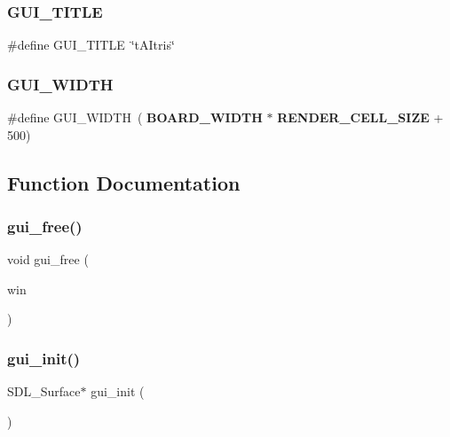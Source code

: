 \mbox{\label{gui_8h_a88560096823bda7d0ff9165dec4c412a}} 
\subsubsection{G\+U\+I\+\_\+\+T\+I\+T\+LE}
{\footnotesize\ttfamily \#define G\+U\+I\+\_\+\+T\+I\+T\+LE~\char`\"{}t\+A\+Itris\char`\"{}}

\mbox{\label{gui_8h_af72c538c04125af7ac8b573d9984c736}} 
\subsubsection{G\+U\+I\+\_\+\+W\+I\+D\+TH}
{\footnotesize\ttfamily \#define G\+U\+I\+\_\+\+W\+I\+D\+TH~(\textbf{ B\+O\+A\+R\+D\+\_\+\+W\+I\+D\+TH} $\ast$ \textbf{ R\+E\+N\+D\+E\+R\+\_\+\+C\+E\+L\+L\+\_\+\+S\+I\+ZE} + 500)}



\subsection{Function Documentation}
\mbox{\label{gui_8h_a3503dc62ac89480ae9d98796a64c6555}} 
\subsubsection{gui\+\_\+free()}
{\footnotesize\ttfamily void gui\+\_\+free (\begin{DoxyParamCaption}\item[{S\+D\+L\+\_\+\+Surface $\ast$}]{win }\end{DoxyParamCaption})\hspace{0.3cm}{\ttfamily [inline]}}

\mbox{\label{gui_8h_ae520d31222038882a553a4b9f32991fa}} 
\subsubsection{gui\+\_\+init()}
{\footnotesize\ttfamily S\+D\+L\+\_\+\+Surface$\ast$ gui\+\_\+init (\begin{DoxyParamCaption}{ }\end{DoxyParamCaption})\hspace{0.3cm}{\ttfamily [inline]}}

